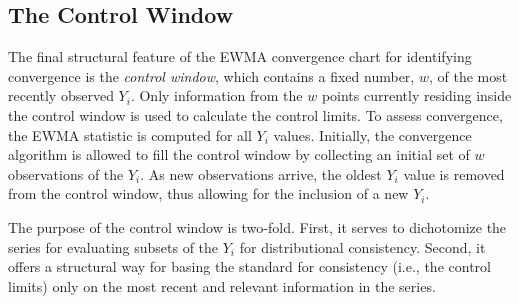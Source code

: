 \documentclass{article}
\begin{document}
%
%
\subsection{The Control Window}
%
%

The final structural feature of the EWMA convergence chart for identifying 
convergence is the {\it control window}, which contains 
a fixed number, $w$, of the most recently observed $Y_i$. Only information from 
the $w$ points currently residing inside the control window is used to 
calculate the control limits. To assess convergence, the EWMA statistic 
is computed for all $Y_i$ values. Initially, the convergence algorithm is 
allowed to fill the control window by collecting an initial set of $w$ 
observations of the $Y_i$. As new observations arrive, the oldest $Y_i$ value 
is removed from the control window, thus allowing for the inclusion of a new 
$Y_i$.

%
%

The purpose of the control window is two-fold. First, it serves to dichotomize 
the series for evaluating subsets of the $Y_i$ for distributional 
consistency. Second, it offers a structural way for basing the standard for 
consistency (i.e., the control limits) only on the most recent and relevant 
information in the series. 

%
%

                                                                                                         



%
%
%
\end{document}
